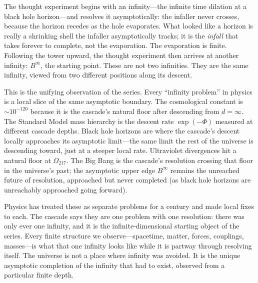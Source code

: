 \documentclass[12pt,a4paper]{article}
\begin{document}
The thought experiment begins with an infinity---the infinite time dilation at a
black hole horizon---and resolves it asymptotically: the infaller never crosses,
because the horizon recedes as the hole evaporates. What looked like a horizon is
really a shrinking shell the infaller asymptotically tracks; it is the
\emph{infall} that takes forever to complete, not the evaporation. The evaporation
is finite. Following the tower upward, the thought experiment then arrives at
another infinity: $B^\infty$, the starting point. These are not two infinities.
They are the same infinity, viewed from two different positions along its descent.

This is the unifying observation of the series. Every ``infinity problem'' in
physics is a local slice of the same asymptotic boundary. The cosmological
constant is $\sim 10^{-120}$ because it is the cascade's natural floor after
descending from $d=\infty$. The Standard Model mass hierarchy is the descent rate
$\exp(-\Phi)$ measured at different cascade depths. Black hole horizons are where
the cascade's descent locally approaches its asymptotic limit---the same limit
the rest of the universe is descending toward, just at a steeper local rate.
Ultraviolet divergences hit a natural floor at $\Omega_{217}$. The Big Bang
is the cascade's resolution crossing that floor in the universe's past;
the asymptotic upper edge $B^\infty$ remains the unreached future of
resolution, approached but never completed (as black hole horizons are
unreachably approached going forward).

Physics has treated these as separate problems for a century and made local
fixes to each. The cascade says they are one problem with one resolution: there
was only ever one infinity, and it is the infinite-dimensional starting object
of the series. Every finite structure we observe---spacetime, matter, forces,
couplings, masses---is what that one infinity looks like while it is partway
through resolving itself. The universe is not a place where infinity was avoided.
It is the unique asymptotic completion of the infinity that had to exist,
observed from a particular finite depth.
\end{document}
